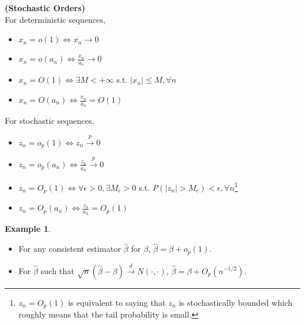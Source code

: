 \documentclass[11pt]{article} %
\theoremstyle{definition}
\numberwithin{defn}{subsection}
\numberwithin{thm}{subsection}
\newtheorem*{rmk}{Remark}
\newtheorem{ex}{Example}
\numberwithin{ex}{subsection}
\newcommand{\plim}{\overset{p}{\rightarrow}}
\newcommand{\dlim}{\overset{d}{\rightarrow}}
\newcommand{\bhat}{\hat{\beta}}
\begin{document}
\begin{defn}\textbf{(Stochastic Orders)}\\
	For deterministic sequences,
	\begin{itemize}
		\item $x_n=o(1)\iff x_n\rightarrow0$
		\item $x_n=o(a_n)\iff \frac{x_n}{a_n}\rightarrow 0$
		\item $x_n=O(1) \iff \exists M<+\infty$ s.t. $|x_n|\le M,\forall n$
		\item $x_n=O(a_n) \iff \frac{x_n}{a_n}=O(1)$
	\end{itemize}
	For stochastic sequences, 
	\begin{itemize}
		\item $z_n=o_p(1)\iff z_n\plim 0$
		\item $z_n=o_p(a_n)\iff\frac{z_n}{a_n}\plim 0$
		\item $z_n=O_p(1)\iff \forall\epsilon>0,\exists M_{\epsilon}>0$ s.t. $P(|z_n|>M_{\epsilon})<\epsilon,\forall n$\footnote{$z_n=O_p(1)$ is equivalent to saying that $z_n$ is stochastically bounded which roughly means that the tail probability is small.}
		\item $z_n=O_p(a_n)\iff\frac{z_n}{a_n}=O_p(1)$
	\end{itemize}
\end{defn}


\begin{ex} \leavevmode
	\begin{itemize}
		\item For any consistent estimator $\hat{\beta}$ for $\beta$, $\hat{\beta}=\beta+o_p(1)$.
		\item For $\bhat$ such that $\sqrt{n}(\bhat-\beta)\dlim N(\cdot,\cdot)$, $\hat{\beta}=\beta+O_p(n^{-1/2}).$
	\end{itemize}
\end{ex}
\end{document}

